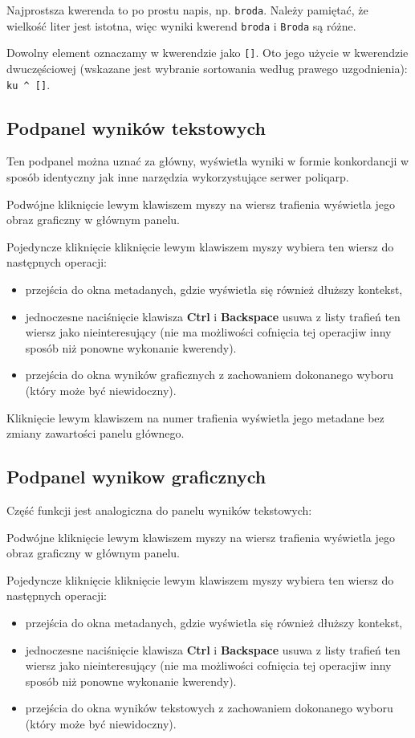 \documentclass{mwart}
\def\key#1{\textbf{#1}}
\begin{document}
Najprostsza kwerenda to po prostu napis, np. \texttt{broda}. Należy
pamiętać, że wielkość liter jest istotna, więc wyniki kwerend
\texttt{broda} i \texttt{Broda} są różne.

Dowolny element oznaczamy w kwerendzie jako \texttt{[]}. Oto jego
użycie w kwerendzie dwuczęściowej (wskazane jest wybranie sortowania
według prawego uzgodnienia): \verb|ku ^ []|.

\subsection{Podpanel wyników tekstowych}
\label{sec:podp-wynik-tekst}

Ten podpanel można uznać za główny, wyświetla wyniki w formie
konkordancji w sposób identyczny jak inne narzędzia wykorzystujące
serwer \textsf{poliqarp}.

Podwójne kliknięcie lewym klawiszem myszy na wiersz trafienia wyświetla jego obraz
graficzny w głównym panelu.

Pojedyncze kliknięcie kliknięcie lewym klawiszem myszy wybiera ten wiersz do następnych operacji:
\begin{itemize}
\item przejścia do okna metadanych, gdzie wyświetla się również dłuższy kontekst,
\item jednoczesne naciśnięcie klawisza \key{Ctrl} i \key{Backspace}
  usuwa z listy trafień ten wiersz jako nieinteresujący (nie ma
  możliwości cofnięcia tej operacjiw inny sposób niż ponowne wykonanie
  kwerendy).
\item przejścia do okna wyników graficznych z zachowaniem dokonanego
  wyboru (który może być niewidoczny).
\end{itemize}

Kliknięcie lewym klawiszem na numer trafienia wyświetla jego metadane
bez zmiany zawartości panelu głównego.

\subsection{Podpanel wynikow graficznych}
\label{sec:podp-wynik-graf}

Część funkcji jest analogiczna do panelu wyników tekstowych:

Podwójne kliknięcie lewym klawiszem myszy na wiersz trafienia wyświetla jego obraz
graficzny w głównym panelu.

Pojedyncze kliknięcie kliknięcie lewym klawiszem myszy wybiera ten wiersz do następnych operacji:
\begin{itemize}
\item przejścia do okna metadanych, gdzie wyświetla się również dłuższy kontekst,
\item jednoczesne naciśnięcie klawisza \key{Ctrl} i \key{Backspace}
  usuwa z listy trafień ten wiersz jako nieinteresujący (nie ma
  możliwości cofnięcia tej operacjiw inny sposób niż ponowne wykonanie
  kwerendy).
\item przejścia do okna wyników tekstowych z zachowaniem dokonanego
  wyboru (który może być niewidoczny).
\end{itemize}
\end{document}
